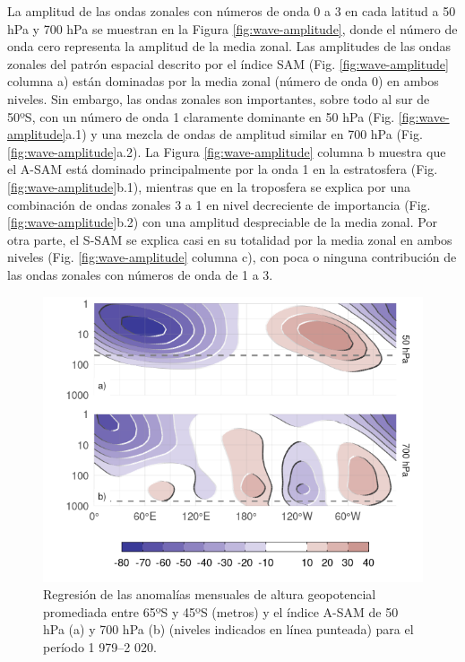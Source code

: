\documentclass[12pt,oneside,a4paper]{reedthesis}
\begin{document}
La amplitud de las ondas zonales con números de onda 0 a 3 en cada latitud a 50 hPa y 700 hPa se muestran en la Figura \ref{fig:wave-amplitude}, donde el número de onda cero representa la amplitud de la media zonal.
Las amplitudes de las ondas zonales del patrón espacial descrito por el índice SAM (Fig. \ref{fig:wave-amplitude} columna a) están dominadas por la media zonal (número de onda 0) en ambos niveles.
Sin embargo, las ondas zonales son importantes, sobre todo al sur de 50ºS, con un número de onda 1 claramente dominante en 50 hPa (Fig. \ref{fig:wave-amplitude}a.1) y una mezcla de ondas de amplitud similar en 700 hPa (Fig. \ref{fig:wave-amplitude}a.2).
La Figura \ref{fig:wave-amplitude} columna b muestra que el A-SAM está dominado principalmente por la onda 1 en la estratosfera (Fig. \ref{fig:wave-amplitude}b.1), mientras que en la troposfera se explica por una combinación de ondas zonales 3 a 1 en nivel decreciente de importancia (Fig. \ref{fig:wave-amplitude}b.2) con una amplitud despreciable de la media zonal.
Por otra parte, el S-SAM se explica casi en su totalidad por la media zonal en ambos niveles (Fig. \ref{fig:wave-amplitude} columna c), con poca o ninguna contribución de las ondas zonales con números de onda de 1 a 3.



\begin{figure}

{\centering \includegraphics{figures/30-sam/vertical-regression-1} 

}

\caption{Regresión de las anomalías mensuales de altura geopotencial promediada entre 65ºS y 45ºS (metros) y el índice A-SAM de 50 hPa (a) y 700 hPa (b) (niveles indicados en línea punteada) para el período 1 979--2 020.}\label{fig:vertical-regression}
\end{figure}
\end{document}
